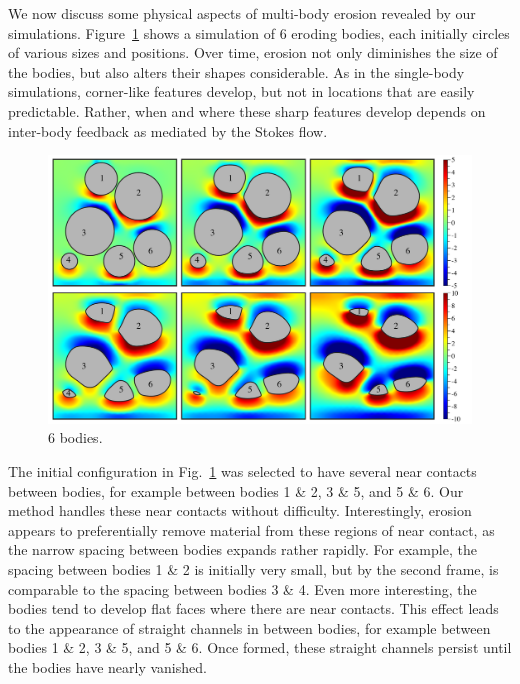 \documentclass[preprint, 10pt]{elsarticle}
\begin{document}
We now discuss some physical aspects of multi-body erosion revealed by our simulations. Figure~\ref{fig:06bodies} shows a simulation of 6 eroding bodies, each initially circles of various sizes and positions. Over time, erosion not only diminishes the size of the bodies, but also alters their shapes considerable. As in the single-body simulations, corner-like features develop, but not in locations that are easily predictable. Rather, when and where these sharp features develop depends on inter-body feedback as mediated by the Stokes flow.

\begin{figure}%
\begin{center}
\includegraphics[width = 0.9 \textwidth]{./figs/06bod.pdf}
\caption{\label{fig:06bodies} 6 bodies.
}
\end{center}
\end{figure}

The initial configuration in  Fig.~\ref{fig:06bodies} was selected to have several near contacts between bodies, for example between bodies 1 \& 2, 3 \& 5, and 5 \& 6. Our method handles these near contacts without difficulty. Interestingly, erosion appears to preferentially remove material from these regions of near contact, as the narrow spacing between bodies expands rather rapidly. For example, the spacing between bodies 1 \& 2 is initially very small, but by the second frame, is comparable to the spacing between bodies 3 \& 4. Even more interesting, the bodies tend to develop flat faces where there are near contacts. This effect leads to the appearance of straight channels in between bodies, for example between bodies 1 \& 2, 3 \& 5, and 5 \& 6. Once formed, these straight channels persist until the bodies have nearly vanished.
\end{document}
